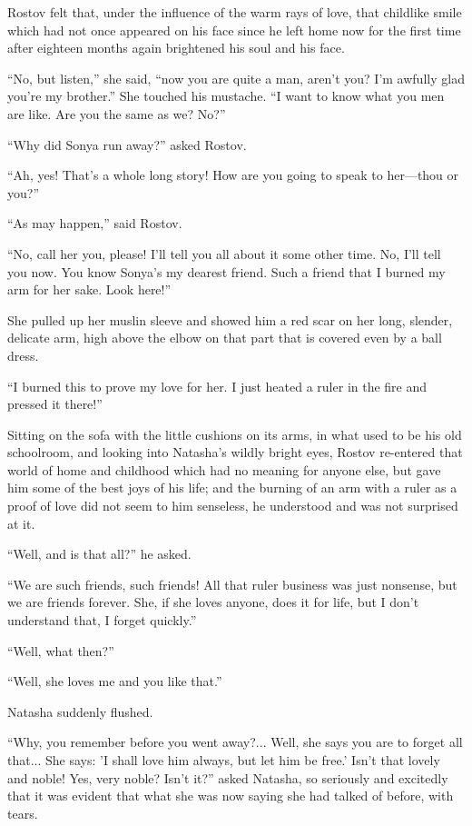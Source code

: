Rostov felt that, under the influence of the warm rays of love,
that childlike smile which had not once appeared on his face
since he left home now for the first time after eighteen months
again brightened his soul and his face.

``No, but listen,'' she said, ``now you are quite a man, aren't
you? I'm awfully glad you're my brother.'' She touched his
mustache. ``I want to know what you men are like. Are you the
same as we? No?''

``Why did Sonya run away?'' asked Rostov.

``Ah, yes! That's a whole long story! How are you going to speak
to her---thou or you?''

``As may happen,'' said Rostov.

``No, call her you, please! I'll tell you all about it some other
time.  No, I'll tell you now. You know Sonya's my dearest
friend. Such a friend that I burned my arm for her sake. Look
here!''

She pulled up her muslin sleeve and showed him a red scar on her
long, slender, delicate arm, high above the elbow on that part
that is covered even by a ball dress.

``I burned this to prove my love for her. I just heated a ruler
in the fire and pressed it there!''

Sitting on the sofa with the little cushions on its arms, in what
used to be his old schoolroom, and looking into Natasha's wildly
bright eyes, Rostov re-entered that world of home and childhood
which had no meaning for anyone else, but gave him some of the
best joys of his life; and the burning of an arm with a ruler as
a proof of love did not seem to him senseless, he understood and
was not surprised at it.

``Well, and is that all?'' he asked.

``We are such friends, such friends! All that ruler business was
just nonsense, but we are friends forever. She, if she loves
anyone, does it for life, but I don't understand that, I forget
quickly.''

``Well, what then?''

``Well, she loves me and you like that.''

Natasha suddenly flushed.

``Why, you remember before you went away?... Well, she says you
are to forget all that... She says: 'I shall love him always, but
let him be free.' Isn't that lovely and noble! Yes, very noble?
Isn't it?'' asked Natasha, so seriously and excitedly that it was
evident that what she was now saying she had talked of before,
with tears.

